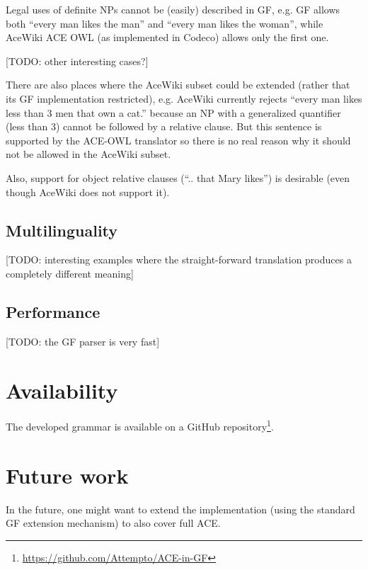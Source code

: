 \documentclass[a4paper]{article}
\begin{document}
Legal uses of definite NPs cannot be (easily) described in GF, e.g. GF
allows both ``every man likes the man'' and ``every man likes the woman'',
while AceWiki ACE OWL (as implemented in Codeco) allows only the
first one.

[TODO: other interesting cases?]

There are also
places where the AceWiki subset could be extended (rather that its GF
implementation restricted), e.g. AceWiki currently rejects ``every man
likes less than 3 men that own a cat.'' because an NP with a
generalized quantifier (less than 3) cannot be followed by a relative
clause. But this sentence is supported by the ACE-OWL translator
so there is no real reason why it should not be allowed in the
AceWiki subset.

Also, support for object relative clauses (``.. that Mary likes'')
is desirable (even though AceWiki does not support it).

\subsection{Multilinguality}

[TODO: interesting examples where the straight-forward translation produces
a completely different meaning]

\subsection{Performance}

[TODO: the GF parser is very fast]

\section{Availability}

The developed grammar is available on a GitHub
repository\footnote{\url{https://github.com/Attempto/ACE-in-GF}}.

\section{Future work}

In the
future, one might want to extend the implementation (using
the standard GF extension mechanism) to also cover full ACE.



%
\end{document}
